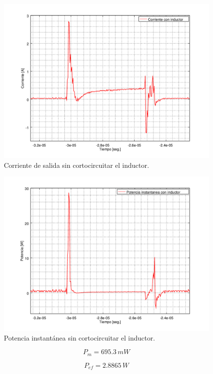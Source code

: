 \documentclass[10pt,spanish,a4paper,openany,notitlepage]{article}
\begin{document}
\begin{figure}[H]
\centering
\includegraphics[scale=0.65]{./Octave/IGBT/corriente_con_L.png}
\caption{Corriente de salida sin cortocircuitar el inductor.}
\label{fig:corriente_con_L}
\end{figure}

\begin{figure}[H]
\centering
\includegraphics[scale=0.65]{./Octave/IGBT/Potencia_con_L.png}
\caption{Potencia instantánea sin cortocircuitar el inductor.}
\label{fig:P_m}
\end{figure}

\[ \displaystyle P_m=695.3\,\unit{mW} \]

\[ \displaystyle P_{ef}= 2.8865\,\unit{W} \]
\end{document}
